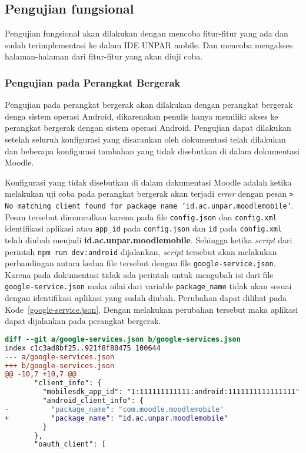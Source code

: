\subsection{Pengujian fungsional}
Pengujian fungsional akan dilakukan dengan mencoba fitur-fitur yang ada dan sudah terimplementasi ke dalam IDE UNPAR mobile. Dan mencoba mengakses halaman-halaman dari fitur-fitur yang akan diuji coba.

\subsubsection{Pengujian pada Perangkat Bergerak}
Pengujian pada perangkat bergerak akan dilakukan dengan perangkat bergerak denga sistem operasi Android, dikarenakan penulis hanya memiliki akses ke perangkat bergerak dengan sistem operasi Android. Pengujian dapat dilakukan setelah seluruh konfigurasi yang disarankan oleh dokumentasi telah dilakukan dan beberapa konfigurasi tambahan yang tidak disebutkan di dalam dokumentasi Moodle.

Konfigurasi yang tidak disebutkan di dalam dokumentasi Moodle adalah ketika melakukan uji coba pada perangkat bergerak akan terjadi \textit{error} dengan pesan \texttt{> No matching client found for package name 'id.ac.unpar.moodlemobile'}. Pesan tersebut dimunculkan karena pada file \texttt{config.json} dan \texttt{config.xml} identifikasi aplikasi atau \texttt{app\_id} pada \texttt{config.json} dan \texttt{id} pada \texttt{config.xml} telah diubah menjadi \textbf{id.ac.unpar.moodlemobile}. Sehingga ketika \textit{script} dari perintah \texttt{npm run dev:android} dijalankan, \textit{script} tersebut akan melakukan perbandingan antara kedua file tersebut dengan file \texttt{google-service.json}. Karena pada dokumentasi tidak ada perintah untuk mengubah isi dari file \texttt{google-service.json} maka nilai dari variable \texttt{package\_name} tidak akan sesuai dengan identifikasi aplikasi yang sudah diubah. Perubahan dapat dilihat pada \mbox{Kode \ref{google-service.json}}. Dengan melakukan perubahan tersebut maka aplikasi dapat dijalankan pada perangkat bergerak.

\begin{lstlisting}[language = diff, frame=single, label ={google-service.json}, caption = Menyesuaikan \texttt{package\_name} dengan \texttt{app\_id} pada \texttt{google-service.json} ]
diff --git a/google-services.json b/google-services.json
index c1c3ad8bf25..921f8f80475 100644
--- a/google-services.json
+++ b/google-services.json
@@ -10,7 +10,7 @@
       "client_info": {
         "mobilesdk_app_id": "1:111111111111:android:1111111111111111",
         "android_client_info": {
-          "package_name": "com.moodle.moodlemobile"
+          "package_name": "id.ac.unpar.moodlemobile"
         }
       },
       "oauth_client": [
\end{lstlisting}


